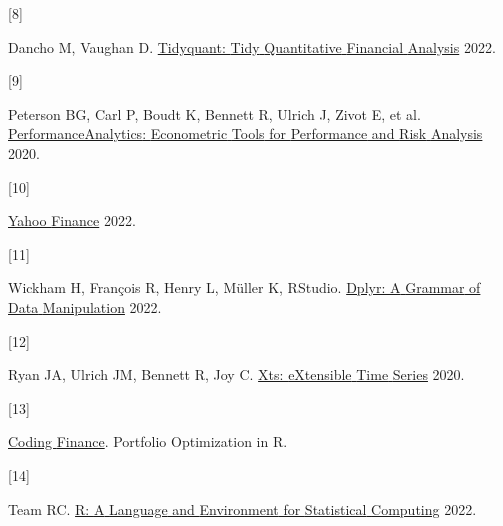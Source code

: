 \documentclass[
]{article}
\newlength{\cslhangindent}
\newlength{\csllabelwidth}
\newlength{\cslentryspacingunit} %
\newenvironment{CSLReferences}[2] %
 {%
  \setlength{\parindent}{0pt}
  \ifodd #1
  \let\oldpar\par
  \def\par{\hangindent=\cslhangindent\oldpar}
  \fi
  \setlength{\parskip}{#2\cslentryspacingunit}
 }%
 {}
\newcommand{\CSLLeftMargin}[1]{\parbox[t]{\csllabelwidth}{#1}}
\newcommand{\CSLRightInline}[1]{\parbox[t]{\linewidth - \csllabelwidth}{#1}\break}
\begin{document}
\begin{CSLReferences}{0}{0}
\leavevmode{}%
\CSLLeftMargin{{[}8{]} }%
\CSLRightInline{Dancho M, Vaughan D.
\href{https://CRAN.R-project.org/package=tidyquant}{Tidyquant: {Tidy}
{Quantitative} {Financial} {Analysis}} 2022.}

\leavevmode{}%
\CSLLeftMargin{{[}9{]} }%
\CSLRightInline{Peterson BG, Carl P, Boudt K, Bennett R, Ulrich J, Zivot
E, et al.
\href{https://CRAN.R-project.org/package=PerformanceAnalytics}{{PerformanceAnalytics}:
{Econometric} {Tools} for {Performance} and {Risk} {Analysis}} 2020.}

\leavevmode{}%
\CSLLeftMargin{{[}10{]} }%
\CSLRightInline{\href{https://finance.yahoo.com/}{Yahoo {Finance}}
2022.}

\leavevmode{}%
\CSLLeftMargin{{[}11{]} }%
\CSLRightInline{Wickham H, François R, Henry L, Müller K, RStudio.
\href{https://CRAN.R-project.org/package=dplyr}{Dplyr: {A} {Grammar} of
{Data} {Manipulation}} 2022.}

\leavevmode{}%
\CSLLeftMargin{{[}12{]} }%
\CSLRightInline{Ryan JA, Ulrich JM, Bennett R, Joy C.
\href{https://CRAN.R-project.org/package=xts}{Xts: {eXtensible} {Time}
{Series}} 2020.}

\leavevmode{}%
\CSLLeftMargin{{[}13{]} }%
\CSLRightInline{\href{https://www.codingfinance.com/post/2018-05-31-portfolio-opt-in-r/}{Coding
{Finance}}. Portfolio Optimization in R.}

\leavevmode{}%
\CSLLeftMargin{{[}14{]} }%
\CSLRightInline{Team RC. \href{https://www.r-project.org/}{R: {A}
{Language} and {Environment} for {Statistical} {Computing}} 2022.}

\end{CSLReferences}
\end{document}
